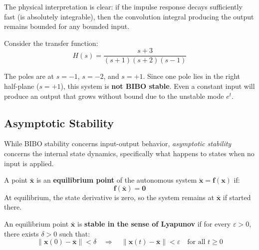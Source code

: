 The physical interpretation is clear: if the impulse response decays sufficiently fast (is absolutely integrable), then the convolution integral producing the output remains bounded for any bounded input.

\begin{example}
\label{ex:bibo_assessment}
Consider the transfer function:
\begin{equation}
H(s) = \frac{s + 3}{(s + 1)(s + 2)(s - 1)}
\end{equation}

The poles are at $s = -1$, $s = -2$, and $s = +1$. Since one pole lies in the right half-plane ($s = +1$), this system is \textbf{not BIBO stable}. Even a constant input will produce an output that grows without bound due to the unstable mode $e^{t}$.
\end{example}

\subsection{Asymptotic Stability}

While BIBO stability concerns input-output behavior, \textit{asymptotic stability} concerns the internal state dynamics, specifically what happens to states when no input is applied.

\begin{definition}
\label{def:equilibrium}
A point $\bar{\mathbf{x}}$ is an \textbf{equilibrium point} of the autonomous system $\dot{\mathbf{x}} = \mathbf{f}(\mathbf{x})$ if:
\begin{equation}
\mathbf{f}(\bar{\mathbf{x}}) = \mathbf{0}
\end{equation}
At equilibrium, the state derivative is zero, so the system remains at $\bar{\mathbf{x}}$ if started there.
\end{definition}

\begin{definition}
\label{def:lyapunov_stability}
An equilibrium point $\bar{\mathbf{x}}$ is \textbf{stable in the sense of Lyapunov} if for every $\varepsilon > 0$, there exists $\delta > 0$ such that:
\begin{equation}
\|\mathbf{x}(0) - \bar{\mathbf{x}}\| < \delta \quad \Rightarrow \quad \|\mathbf{x}(t) - \bar{\mathbf{x}}\| < \varepsilon \quad \text{for all } t \geq 0
\end{equation}
\end{definition}

